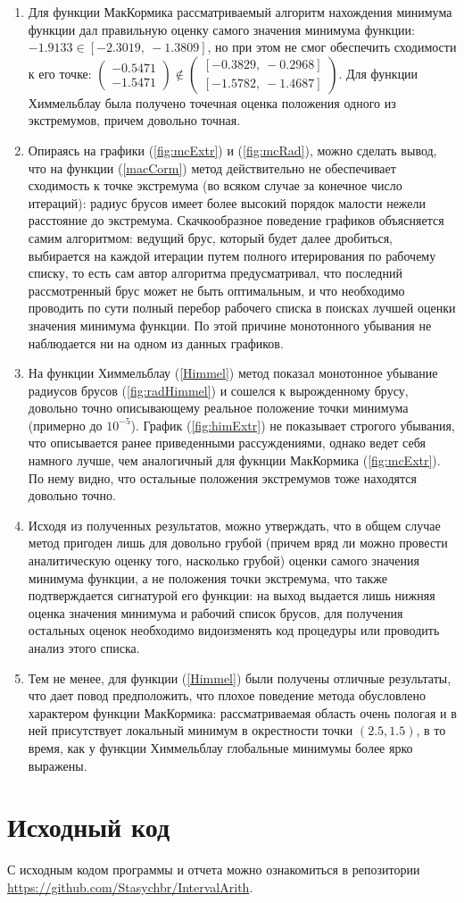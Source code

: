 \documentclass[a4paper]{article}
\begin{document}
\begin{enumerate}
    \item Для функции МакКормика рассматриваемый алгоритм нахождения минимума функции дал правильную оценку самого значения минимума функции: $-1.9133\in[-2.3019,\:-1.3809]$, но при этом не смог обеспечить сходимости к его точке: $\left(\begin{smallmatrix}
    -0.5471\\ -1.5471
    \end{smallmatrix}\right)\notin \left(\begin{smallmatrix}
    [   -0.3829,\:    -0.2968]\\ 
[   -1.5782,\:   -1.4687]
    \end{smallmatrix}\right)$. Для функции Химмельблау была получено точечная оценка положения одного из экстремумов, причем довольно точная.
    \item Опираясь на графики (\ref{fig:mcExtr}) и (\ref{fig:mcRad}), можно сделать вывод, что на функции (\ref{macCorm}) метод действительно не обеспечивает сходимость к точке экстремума (во всяком случае за конечное число итераций): радиус брусов имеет более высокий порядок малости нежели расстояние до экстремума. Скачкообразное поведение графиков объясняется самим алгоритмом: ведущий брус, который будет далее дробиться, выбирается на каждой итерации путем полного итерирования по рабочему списку, то есть сам автор алгоритма предусматривал, что последний рассмотренный брус может не быть оптимальным, и что необходимо проводить по сути полный перебор рабочего списка в поисках лучшей оценки значения минимума функции. По этой причине монотонного убывания не наблюдается ни на одном из данных графиков.
    \item На функции Химмельблау (\ref{Himmel}) метод показал монотонное убывание радиусов брусов (\ref{fig:radHimmel}) и сошелся к вырожденному брусу, довольно точно описывающему реальное положение точки минимума (примерно до $10^{-5}$). График (\ref{fig:himExtr}) не показывает строгого убывания, что описывается ранее приведенными рассуждениями, однако ведет себя намного лучше, чем аналогичный для фукнции МакКормика (\ref{fig:mcExtr}). По нему видно, что остальные положения экстремумов тоже находятся довольно точно.
    \item Исходя из полученных результатов, можно утверждать, что в общем случае метод пригоден лишь для довольно грубой (причем вряд ли можно провести аналитическую оценку того, насколько грубой) оценки самого значения минимума функции, а не положения точки экстремума, что также подтверждается сигнатурой его функции: на выход выдается лишь нижняя оценка значения минимума и рабочий список брусов, для получения остальных оценок необходимо видоизменять код процедуры или проводить анализ этого списка.
    \item Тем не менее, для функции (\ref{Himmel}) были получены отличные результаты, что дает повод предположить, что плохое поведение метода обусловлено характером функции МакКормика: рассматриваемая область очень пологая и в ней присутствует локальный минимум в окрестности точки $(2.5,1.5)$, в то время, как у функции Химмельблау глобальные минимумы более ярко выражены.
\end{enumerate}
\section*{Исходный код}
С исходным кодом программы и отчета можно ознакомиться в репозитории \url{https://github.com/Stasychbr/IntervalArith}.
\end{document}
